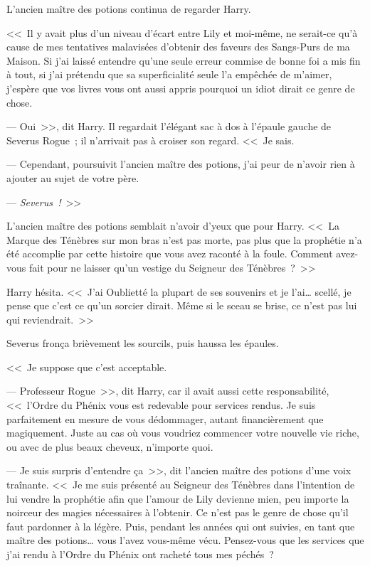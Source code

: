 L'ancien maître des potions continua de regarder Harry.

<<~Il y avait plus d'un niveau d'écart entre Lily et moi-même, ne serait-ce qu'à cause de mes tentatives malavisées d'obtenir des faveurs des Sangs-Purs de ma Maison. Si j'ai laissé entendre qu'une seule erreur commise de bonne foi a mis fin à tout, si j'ai prétendu que sa superficialité seule l'a empêchée de m'aimer, j'espère que vos livres vous ont aussi appris pourquoi un idiot dirait ce genre de chose.

--- Oui~>>, dit Harry. Il regardait l'élégant sac à dos à l'épaule gauche de Severus Rogue~; il n'arrivait pas à croiser son regard. <<~Je sais.

--- Cependant, poursuivit l'ancien maître des potions, j'ai peur de n'avoir rien à ajouter au sujet de votre père.

--- \emph{Severus~!}~>>

L'ancien maître des potions semblait n'avoir d'yeux que pour Harry. <<~La Marque des Ténèbres sur mon bras n'est pas morte, pas plus que la prophétie n'a été accomplie par cette histoire que vous avez raconté à la foule. Comment avez-vous fait pour ne laisser qu'un vestige du Seigneur des Ténèbres~?~>>

Harry hésita. <<~J'ai Oublietté la plupart de ses souvenirs et je l'ai… scellé, je pense que c'est ce qu'un sorcier dirait. Même si le sceau se brise, ce n'est pas lui qui reviendrait.~>>

Severus fronça brièvement les sourcils, puis haussa les épaules.

<<~Je suppose que c'est acceptable.

--- Professeur Rogue~>>, dit Harry, car il avait aussi cette responsabilité, <<~l'Ordre du Phénix vous est redevable pour services rendus. Je suis parfaitement en mesure de vous dédommager, autant financièrement que magiquement. Juste au cas où vous voudriez commencer votre nouvelle vie riche, ou avec de plus beaux cheveux, n'importe quoi.

--- Je suis surpris d'entendre ça~>>, dit l'ancien maître des potions d'une voix traînante. <<~Je me suis présenté au Seigneur des Ténèbres dans l'intention de lui vendre la prophétie afin que l'amour de Lily devienne mien, peu importe la noirceur des magies nécessaires à l'obtenir. Ce n'est pas le genre de chose qu'il faut pardonner à la légère. Puis, pendant les années qui ont suivies, en tant que maître des potions… vous l'avez vous-même vécu. Pensez-vous que les services que j'ai rendu à l'Ordre du Phénix ont racheté tous mes péchés~?

